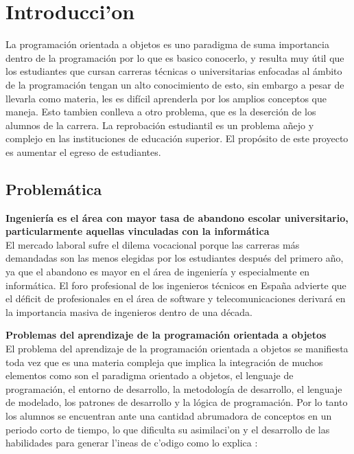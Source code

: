 \chapter{Introducci'on}
La programación orientada a objetos es uno paradigma de suma importancia dentro de la programación por lo que es basico conocerlo, y resulta muy útil que los estudiantes que cursan carreras técnicas o universitarias enfocadas al ámbito de la programación tengan un alto conocimiento de esto, sin embargo a pesar de llevarla como materia, les es difícil aprenderla por los amplios conceptos que maneja. Esto tambien conlleva a otro problema, que es la deserción de los alumnos de la carrera. La reprobación estudiantil es un problema añejo y complejo en las instituciones de educación superior. El propósito de este proyecto es aumentar el egreso de estudiantes.

\section{Problemática}
\textbf{Ingeniería es el área con mayor tasa de abandono escolar universitario, particularmente aquellas vinculadas con la informática}\\\newline
El mercado laboral sufre el dilema vocacional porque las carreras más demandadas son las menos elegidas por los estudiantes después del primero año, ya que el abandono es mayor en el área de ingeniería y especialmente en informática. El foro profesional de los ingenieros técnicos en España advierte que el déficit de profesionales en el área de software y telecomunicaciones derivará en la importancia masiva de ingenieros dentro de una década.\\\newline

\textbf{Problemas del aprendizaje de la programación orientada a objetos}\\\newline
El problema del aprendizaje de la programación orientada a objetos se manifiesta toda vez que es una materia compleja que implica la integración de muchos elementos como son el paradigma orientado a objetos, el lenguaje de programación, el entorno de desarrollo, la metodología de desarrollo, el lenguaje de modelado, los patrones de desarrollo y la lógica de programación. Por lo tanto los alumnos se encuentran ante una cantidad abrumadora de conceptos en un periodo corto de tiempo, lo que dificulta su asimilaci'on y el desarrollo de las habilidades para generar l'ineas de c'odigo como lo explica \cite{spigariol2013ensenando}:

